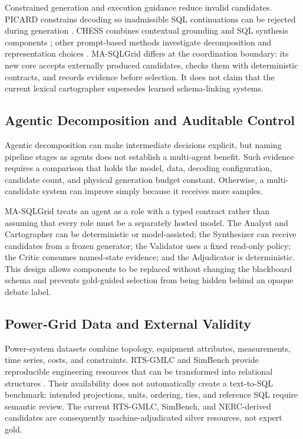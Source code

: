 \documentclass[applsci,article,submit,moreauthors]{Definitions/mdpi}
\newcommand{\masql}{MA-SQLGrid}
\begin{document}
Constrained generation and execution guidance reduce invalid candidates. PICARD constrains decoding so inadmissible SQL continuations can be rejected during generation \cite{scholak2021picard}. CHESS combines contextual grounding and SQL synthesis components \cite{talaei2024chess}; other prompt-based methods investigate decomposition and representation choices \cite{nan2023enhancing,sun2023sqlprompt,pourreza2023dinsql}. \masql{} differs at the coordination boundary: its new core accepts externally produced candidates, checks them with deterministic contracts, and records evidence before selection. It does not claim that the current lexical cartographer supersedes learned schema-linking systems.

\subsection{Agentic Decomposition and Auditable Control}

Agentic decomposition can make intermediate decisions explicit, but naming pipeline stages as agents does not establish a multi-agent benefit. Such evidence requires a comparison that holds the model, data, decoding configuration, candidate count, and physical generation budget constant. Otherwise, a multi-candidate system can improve simply because it receives more samples.

\masql{} treats an agent as a role with a typed contract rather than assuming that every role must be a separately hosted model. The Analyst and Cartographer can be deterministic or model-assisted; the Synthesizer can receive candidates from a frozen generator; the Validator uses a fixed read-only policy; the Critic consumes named-state evidence; and the Adjudicator is deterministic. This design allows components to be replaced without changing the blackboard schema and prevents gold-guided selection from being hidden behind an opaque debate label.

\subsection{Power-Grid Data and External Validity}

Power-system datasets combine topology, equipment attributes, measurements, time series, costs, and constraints. RTS-GMLC and SimBench provide reproducible engineering resources that can be transformed into relational structures \cite{barrows2020rts,meinecke2020simbench}. Their availability does not automatically create a text-to-SQL benchmark: intended projections, units, ordering, ties, and reference SQL require semantic review. The current RTS-GMLC, SimBench, and NERC-derived candidates are consequently machine-adjudicated silver resources, not expert gold.
\end{document}
